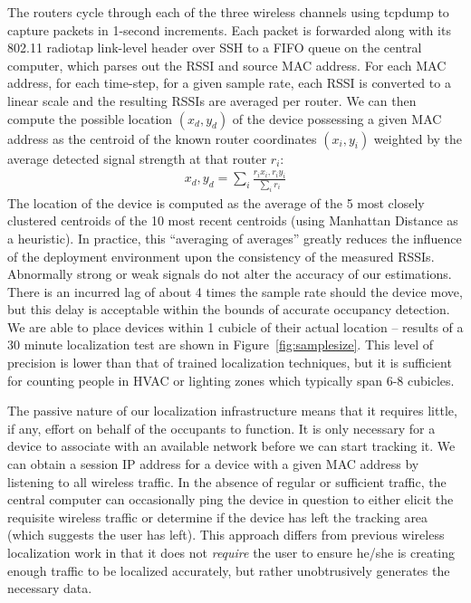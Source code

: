 The routers cycle through each of the three wireless channels using tcpdump to capture packets in 1-second increments. Each packet is forwarded along with its 802.11 radiotap link-level header over SSH to a FIFO queue on the central computer, which parses out the RSSI and source MAC address. For each MAC address, for each time-step, for a given sample rate, each RSSI is converted to a linear scale and the resulting RSSIs are averaged per router. We can then compute the possible location $(x_d,y_d)$ of the device possessing a given MAC address as the centroid of the known router coordinates $(x_i, y_i)$ weighted by the average detected signal strength at that router $r_i$:
\begin{equation}
\begin{split}
x_d, y_d = \displaystyle\sum_{i} \frac{r_ix_i, r_iy_i}{\displaystyle\sum_i r_i}
\end{split}
\end{equation}
The location of the device is computed as the average of the 5 most closely clustered centroids of the 10 most recent centroids (using Manhattan Distance as a heuristic). In practice, this ``averaging of averages'' greatly reduces the influence of the deployment environment upon the consistency of the measured RSSIs. Abnormally strong or weak signals do not alter the accuracy of our estimations. There is an incurred lag of about 4 times the sample rate should the device move, but this delay is acceptable within the bounds of accurate occupancy detection. We are able to place devices within 1 cubicle of their actual location -- results of a 30 minute localization test are shown in Figure~\ref{fig:samplesize}. This level of precision is lower than that of trained localization techniques, but it is sufficient for counting people in HVAC or lighting zones which typically span 6-8 cubicles.

The passive nature of our localization infrastructure means that it requires little, if any, effort on behalf of the occupants to function. It is only necessary for a device to associate with an available network before we can start tracking it. We can obtain a session IP address for a device with a given MAC address by listening to all wireless traffic. In the absence of regular or sufficient traffic, the central computer can occasionally ping the device in question to either elicit the requisite wireless traffic or determine if the device has left the tracking area (which suggests the user has left). This approach differs from previous wireless localization work in that it does not \emph{require} the user to ensure he/she is creating enough traffic to be localized accurately, but rather unobtrusively generates the necessary data. 

